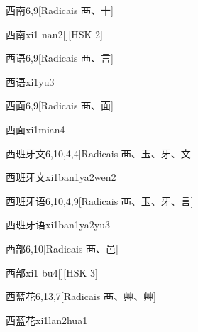 \begin{entry}{西南}{6,9}[Radicais ⾑、⼗]
  \begin{phonetics}{西南}{xi1 nan2}[][HSK 2]
  \end{phonetics}
\end{entry}

\begin{entry}{西语}{6,9}[Radicais ⾑、⾔]
  \begin{phonetics}{西语}{xi1yu3}
  \end{phonetics}
\end{entry}

\begin{entry}{西面}{6,9}[Radicais ⾑、⾯]
  \begin{phonetics}{西面}{xi1mian4}
  \end{phonetics}
\end{entry}

\begin{entry}{西班牙文}{6,10,4,4}[Radicais ⾑、⽟、⽛、⽂]
  \begin{phonetics}{西班牙文}{xi1ban1ya2wen2}
  \end{phonetics}
\end{entry}

\begin{entry}{西班牙语}{6,10,4,9}[Radicais ⾑、⽟、⽛、⾔]
  \begin{phonetics}{西班牙语}{xi1ban1ya2yu3}
  \end{phonetics}
\end{entry}

\begin{entry}{西部}{6,10}[Radicais ⾑、⾢]
  \begin{phonetics}{西部}{xi1 bu4}[][HSK 3]
  \end{phonetics}
\end{entry}

\begin{entry}{西蓝花}{6,13,7}[Radicais ⾑、⾋、⾋]
  \begin{phonetics}{西蓝花}{xi1lan2hua1}
  \end{phonetics}
\end{entry}

